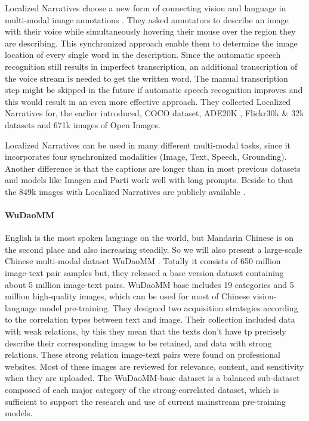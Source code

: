\documentclass[
]{krantz}
\begin{document}
Localized Narratives choose a new form of connecting vision and language in multi-modal image annotations \citep{pont2020connecting}. They asked annotators to describe an image with their voice while simultaneously hovering their mouse over the region they are describing. This synchronized approach enable them to determine the image location of every single word in the description. Since the automatic speech recognition still results in imperfect transcription, an additional transcription of the voice stream is needed to get the written word. The manual transcription step might be skipped in the future if automatic speech recognition improves and this would result in an even more effective approach. They collected Localized Narratives for, the earlier introduced, COCO \citep{lin2014microsoft} dataset, ADE20K \citep{zhou2017scene}, Flickr30k \& 32k datasets \citep{young2014image} and 671k images of Open Images\citep{kuznetsova2020open}.

Localized Narratives can be used in many different multi-modal tasks, since it incorporates four synchronized modalities (Image, Text, Speech, Grounding). Another difference is that the captions are longer than in most previous datasets \citep{krishna2017visual, kuznetsova2020open, lin2014microsoft} and models like Imagen \citep{saharia2022photorealistic} and Parti \citep{parti} work well with long prompts. Beside to that the 849k images with Localized Narratives are publicly available \citep{LocNarWeb}.

\hypertarget{wudaomm}{%
\paragraph{WuDaoMM}\label{wudaomm}}

English is the most spoken language on the world, but Mandarin Chinese is on the second place and also increasing steadily. So we will also present a large-scale Chinese multi-modal dataset WuDaoMM \citep{yuan2022wudaomm}. Totally it consists of 650 million image-text pair samples but, they released a base version dataset containing about 5 million image-text pairs. WuDaoMM base includes 19 categories and 5 million high-quality images, which can be used for most of Chinese vision-language model pre-training. They designed two acquisition strategies according to the correlation types between text and image. Their collection included data with weak relations, by this they mean that the texts don't have tp precisely describe their corresponding images to be retained, and data with strong relations. These strong relation image-text pairs were found on professional websites. Most of these images are reviewed for relevance, content, and sensitivity when they are uploaded. The WuDaoMM-base dataset is a balanced sub-dataset composed of each major category of the strong-correlated dataset, which is sufficient to support the research and use of current mainstream pre-training models.
\end{document}
